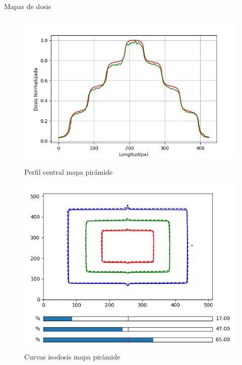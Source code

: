 \documentclass[12pt]{beamer}
\begin{document}
\begin{frame}{Mapas de dosis}
\begin{figure}[htp]%
	\centering
	\begin{minipage}{0.4\textwidth}
		\includegraphics[width=\textwidth]{images/perfilPiramideNormalizado.png}
		\caption{Perfil central mapa pirámide}
	\end{minipage}\hfill
	\begin{minipage}{0.4\textwidth}
		\includegraphics[width=\textwidth]{images/isodosisPiramide2.png}
		\caption{Curvas isodosis mapa pirámide}
	\end{minipage}\par
	\begin{minipage}{0.4\textwidth}

\end{minipage}
\end{figure}
\end{frame}
\end{document}
